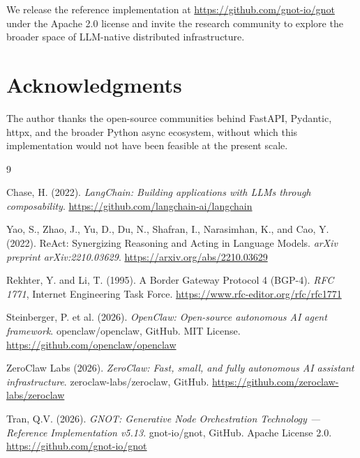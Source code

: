 \documentclass[10pt,twocolumn]{article}
\begin{document}
We release the reference implementation at
\url{https://github.com/gnot-io/gnot}~\cite{gnot2026} under the Apache
2.0 license and invite the research community to explore the broader
space of LLM-native distributed infrastructure.

\section*{Acknowledgments}

The author thanks the open-source communities behind FastAPI, Pydantic,
httpx, and the broader Python async ecosystem, without which this
implementation would not have been feasible at the present scale.

\begin{thebibliography}{9}

  Chase, H. (2022).
  \textit{LangChain: Building applications with LLMs through composability}.
  \url{https://github.com/langchain-ai/langchain}

  Yao, S., Zhao, J., Yu, D., Du, N., Shafran, I., Narasimhan, K., and
  Cao, Y. (2022).
  ReAct: Synergizing Reasoning and Acting in Language Models.
  \textit{arXiv preprint arXiv:2210.03629}.
  \url{https://arxiv.org/abs/2210.03629}

  Rekhter, Y. and Li, T. (1995).
  A Border Gateway Protocol 4 (BGP-4).
  \textit{RFC 1771}, Internet Engineering Task Force.
  \url{https://www.rfc-editor.org/rfc/rfc1771}

  Steinberger, P. et al. (2026).
  \textit{OpenClaw: Open-source autonomous AI agent framework}.
  openclaw/openclaw, GitHub. MIT License.
  \url{https://github.com/openclaw/openclaw}

  ZeroClaw Labs (2026).
  \textit{ZeroClaw: Fast, small, and fully autonomous AI assistant infrastructure}.
  zeroclaw-labs/zeroclaw, GitHub.
  \url{https://github.com/zeroclaw-labs/zeroclaw}

  Tran, Q.V. (2026).
  \textit{GNOT: Generative Node Orchestration Technology --- Reference
  Implementation v5.13}.
  gnot-io/gnot, GitHub. Apache License 2.0.
  \url{https://github.com/gnot-io/gnot}

\end{thebibliography}
\end{document}
